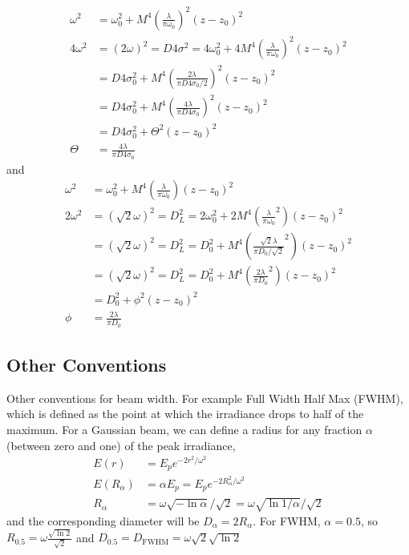 \documentclass[]{article}
\begin{document}
\begin{align}
    \omega^2 &= \omega_0^2 + M^4 \left(\frac{\lambda}{\pi \omega_0}\right)^2 (z-z_0)^2 \\
    4\omega^2 &= (2 \omega)^2 = D4\sigma^2 = 4\omega_0^2 + 4M^4 \left(\frac{\lambda}{\pi \omega_0}\right)^2 (z-z_0)^2 \\
              &= D4\sigma_0^2 + M^4 \left(\frac{2\lambda}{\pi D4\sigma_0 /2}\right)^2 (z-z_0)^2 \\
              &= D4\sigma_0^2 + M^4 \left(\frac{4\lambda}{\pi D4\sigma_0}\right)^2 (z-z_0)^2 \\
              &=  D4\sigma_0^2 + \Theta^2(z-z_0)^2 \\
    \Theta &= \frac{4\lambda}{\pi D4\sigma_0}
\end{align}
and
\begin{align}
    \omega^2 &= \omega_0^2 + M^4 \left(\frac{\lambda}{\pi \omega_0}\right) (z-z_0)^2 \\
    2\omega^2 &= (\sqrt{2}{ \omega})^2  = D_L^2 = 2\omega_0^2 + 2M^4 \left(\frac{\lambda}{\pi \omega_0}^2\right) (z-z_0)^2 \\
              &= (\sqrt{2}{ \omega})^2  = D_L^2 = D_0^2 + M^4 \left(\frac{\sqrt{2}\lambda}{\pi D_0/\sqrt{2}}^2\right) (z-z_0)^2 \\
              &= (\sqrt{2}{ \omega})^2  = D_L^2 = D_0^2 + M^4 \left(\frac{2\lambda}{\pi D_0}^2\right) (z-z_0)^2 \\
              &=  D_0^2 + \phi^2(z-z_0)^2 \\
    \phi &= \frac{2\lambda}{\pi D_0}
\end{align}

\subsection{Other Conventions}

Other conventions for beam width. For example Full Width Half Max (FWHM), which is defined as the point at which the irradiance drops to half of the maximum.
For a Gaussian beam, we can define a radius for any fraction $\alpha$ (between zero and one) of the peak irradiance,
\begin{align}
    E(r) &= E_pe^{-2r^2/\omega^2} \\
    E(R_\alpha) &= \alpha E_p = E_p e^{-2R_\alpha^2/\omega^2} \\
    R_\alpha &= \omega\sqrt{-\ln \alpha }/\sqrt{2} = \omega\sqrt{\ln 1/\alpha } /\sqrt{2}
\end{align}
and the corresponding diameter will be $D_\alpha = 2R_\alpha$. For FWHM, $\alpha = 0.5$, so $R_{0.5} = \omega \frac{\sqrt{\ln 2}}{\sqrt{2}}$ and $D_{0.5} = D_\text{FWHM} = \omega \sqrt{2} \sqrt{\ln 2}$
\end{document}
